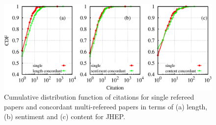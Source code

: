 \begin{figure}
 \centering
 \includegraphics[scale = 0.3]{./texfiles/Chapter_4/cikm_17/figures/citation_mul_all.eps}
 \caption{\label{con:citation} Cumulative distribution function of citations for single refereed papers and concordant multi-refereed papers 
 in terms of (a) length, (b) sentiment 
 and (c) content for JHEP. %
 }
 \vspace{3mm}
\end{figure}

